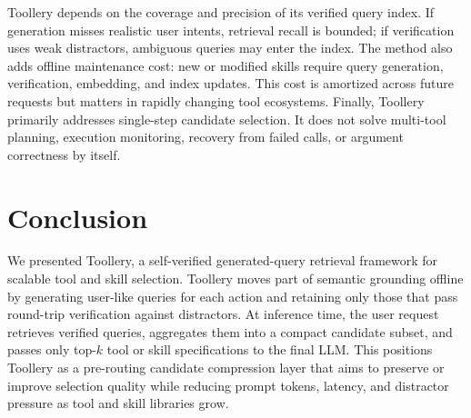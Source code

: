 \documentclass[11pt]{article}
\begin{document}
Toollery depends on the coverage and precision of its verified query index. If generation misses realistic user intents, retrieval recall is bounded; if verification uses weak distractors, ambiguous queries may enter the index. The method also adds offline maintenance cost: new or modified skills require query generation, verification, embedding, and index updates. This cost is amortized across future requests but matters in rapidly changing tool ecosystems. Finally, Toollery primarily addresses single-step candidate selection. It does not solve multi-tool planning, execution monitoring, recovery from failed calls, or argument correctness by itself.

\section{Conclusion}
\label{sec:conclusion}

We presented Toollery, a self-verified generated-query retrieval framework for scalable tool and skill selection. Toollery moves part of semantic grounding offline by generating user-like queries for each action and retaining only those that pass round-trip verification against distractors. At inference time, the user request retrieves verified queries, aggregates them into a compact candidate subset, and passes only top-$k$ tool or skill specifications to the final LLM. This positions Toollery as a pre-routing candidate compression layer that aims to preserve or improve selection quality while reducing prompt tokens, latency, and distractor pressure as tool and skill libraries grow.

\clearpage

\end{document}
